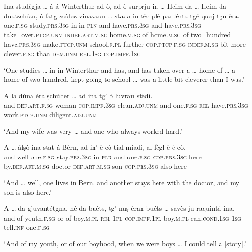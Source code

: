 \begin{linenumbers}
\gll    Ina studègja … á á Winterthur ad ò, ad ò surprju in … Heim\footnotemark{} da … Heim da duatschían, ò fatg scùlas vinavaun … stada in téc plé pardèrta tgé quaj tgu èra.\\
one.\textsc{f.sg} study.\textsc{prs.3sg} {} in in \textsc{pln} and have.\textsc{prs.3sg} and  have.\textsc{prs.3sg} take\_over.\textsc{ptcp.unm} \textsc{indef.art.m.sg} {} home.\textsc{m.sg} of {}  home.\textsc{m.sg} of two\_hundred have.\textsc{prs.3sg} make.\textsc{ptcp.unm} school.\textsc{f.pl} further {} \textsc{cop.ptcp.f.sg} \textsc{indef.m.sg} bit more  clever.\textsc{f.sg} than \textsc{dem.unm} \textsc{rel.1sg} \textsc{cop.impf.1sg} \\
\end{linenumbers}
\medskip
\glt `One studies … in in Winterthur and has, and has taken over a … home of … a home of two hundred, kept going to school … was a little bit cleverer than I was.'
\medskip

\begin{linenumbers}
\gll    A la dùna èra ṣchùber … ad ina tg’ ò luvrau stédi.\\
and \textsc{def.art.f.sg} woman \textsc{cop.impf.3sg} clean.\textsc{adj.unm} {} and one.\textsc{f.sg} \textsc{rel} have.\textsc{prs.3sg} work.\textsc{ptcp.unm} diligent.\textsc{adj.unm} \\
\end{linenumbers}
\medskip
\glt `And my wife was very … and one who always worked hard.'
\medskip

\begin{linenumbers}
\gll    A … álṣò ina stat á Bèrn, ad in’ è cò tial miadi, al fégl è è cò.\\
and {} well one.\textsc{f.sg} stay.\textsc{prs.3sg} in \textsc{pln} and one.\textsc{f.sg} \textsc{cop.prs.3sg} here by.\textsc{def.art.m.sg} doctor \textsc{def.art.m.sg} son \textsc{cop.prs.3sg} also here\\
\end{linenumbers}
\medskip
\glt `And … well, one lives in Bern, and another stays here with the doctor, and my son is also here.'
\medskip

\begin{linenumbers}
\gll A … da gjuvantétgna, né da buéts, tg’ nuṣ èran buéts … savès ju raquintá ina.\\
and {} of  youth.\textsc{f.sg} or of boy.\textsc{m.pl} \textsc{rel} \textsc{1pl} \textsc{cop.impf.1pl} boy.\textsc{m.pl} {} can.\textsc{cond.1sg} \textsc{1sg} tell.\textsc{inf} one.\textsc{f.sg}\\
\end{linenumbers}
\medskip
\glt `And of my youth, or of our boyhood, when we were boys … I could tell a [story].'
\medskip

